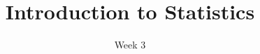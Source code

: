 \title{Introduction to Statistics}
\date{Week 3}





\thispagestyle{plain}


\graphicspath{{lectures/exposure/}}




